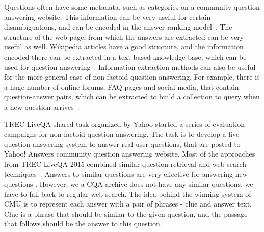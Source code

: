 Questions often have some metadata, such as categories on a community question answering website.
This information can be very useful for certain disambiguations, and can be encoded in the answer ranking model~\cite{zhou2015learning}.
The structure of the web page, from which the answers are extracted can be very useful as well.
Wikipedia articles have a good structure, and the information encoded there can be extracted in a text-based knowledge base, which can be used for question answering~\cite{sondhi2014mining}.
Information extraction methods can also be useful for the more general case of non-factoid question answering.
For example, there is a huge number of online forums, FAQ-pages and social media, that contain question-answer pairs, which can be extracted to build a collection to query when a new question arrives~\cite{cong2008finding,Jijkoun:2005:RAF:1099554.1099571,Yang:2009:ISK:1526709.1526735,ding2008using,li2011question}.

TREC LiveQA shared task organized by Yahoo started a series of evaluation campaigns for non-factoid question answering.
The task is to develop a live question answering system to answer real user questions, that are posted to Yahoo! Answers community question answering website.
Most of the approaches from TREC LiveQA 2015 combined similar question retrieval and web search techniques~\cite{ecnucs_liveqa15,savenkov_liveqa15,diwang_liveqa15}.
Answers to similar questions are very effective for answering new questions \cite{savenkov_liveqa15}.
However, we a CQA archive does not have any similar questions, we have to fall back to regular web search.
The idea behind the winning system of CMU \cite{diwang_liveqa15} is to represent each answer with a pair of phrases - clue and answer text.
Clue is a phrase that should be similar to the given question, and the passage that follows should be the answer to this question.


